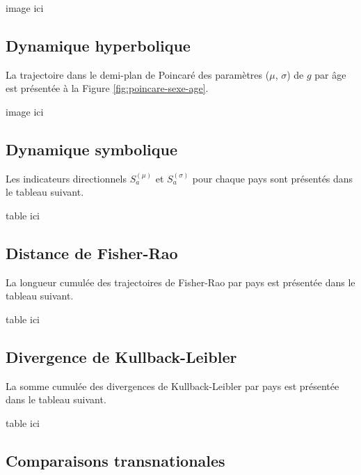 image ici

\subsection{Dynamique hyperbolique}

La trajectoire dans le demi-plan de Poincaré des paramètres ($\mu$, $\sigma$) de $g$ par âge est présentée à la Figure \ref{fig:poincare-sexe-age}.

image ici

\subsection{Dynamique symbolique}

Les indicateurs directionnels $S_a^{(\mu)}$ et $S_a^{(\sigma)}$ pour chaque pays sont présentés dans le tableau suivant.

%
table ici

\subsection{Distance de Fisher-Rao}

La longueur cumulée des trajectoires de Fisher-Rao par pays est présentée dans le tableau suivant.

%
table ici

\subsection{Divergence de Kullback-Leibler}

La somme cumulée des divergences de Kullback-Leibler par pays est présentée dans le tableau suivant.

%
table ici

\subsection{Comparaisons transnationales}

